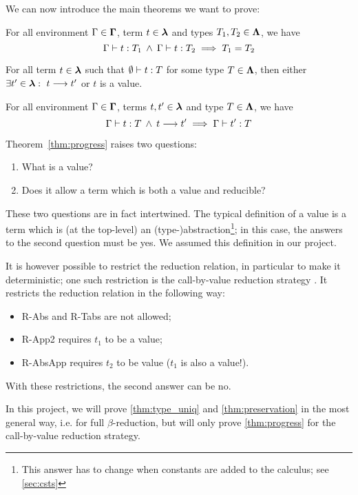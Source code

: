 \noindent
We can now introduce the main theorems we want to prove:
\begin{theorem}\label{thm:type_uniq}
    For all environment $\Gamma \in \bm\Gamma$, term $t \in \bm\lambda$
    and types $T_1,T_2 \in \bm\Lambda$, we have
    \[\typerel{\Gamma}{t}{T_1} \mand \typerel{\Gamma}{t}{T_2} \implies T_1 = T_2\]
\end{theorem}

\begin{theorem}[Progress]\label{thm:progress}
    For all term $t \in \bm\lambda$ such that ${\emptyset \vdash{} t : {T}}$ for some type $T \in \bm\Lambda$, then either ${\exists t' \in \bm\lambda:\ t \longrightarrow{}{} t'}$
    or $t$ is a value.
\end{theorem}

\begin{theorem}[Preservation]\label{thm:preservation}
    For all environment $\Gamma \in \bm\Gamma$, terms $t,t' \in \bm\lambda$
    and type $T \in \bm\Lambda$, we have
    \[\typerel{\Gamma}{t}{T} \mand \reduces{t}{t'} \implies \typerel{\Gamma}{t'}{T}\]
\end{theorem}

\noindent
Theorem~\ref{thm:progress} raises two questions:
\begin{enumerate}
    \item What is a value?
    \item Does it allow a term which is both a value and reducible?
\end{enumerate}
These two questions are in fact intertwined.
The typical definition of a value is a term which is (at the top-level) an (type-)abstraction\footnote{This answer has to change when constants are added to the calculus; see \cref{sec:csts}}; in this case, the answers to the second question must be yes. We assumed this definition in our project.

It is however possible to restrict the reduction relation, in particular to make it deterministic; one such restriction is the call-by-value reduction strategy \cite[Chapter 5]{tapl}. It restricts the reduction relation in the following way:
\begin{itemize}
    \item R-Abs and R-Tabs are not allowed;
    \item R-App2 requires $t_1$ to be a value;
    \item R-AbsApp requires $t_2$ to be value ($t_1$ is also a value!).
\end{itemize}
With these restrictions, the second answer can be no.

In this project, we will prove \cref{thm:type_uniq} and \cref{thm:preservation}
in the most general way, 
i.e. for full $\beta$-reduction,
but will only prove \cref{thm:progress} for the call-by-value reduction strategy.